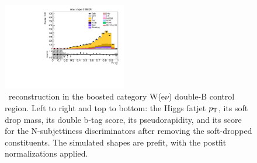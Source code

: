 \begin{figure}[tbp]
\begin{center}
    \includegraphics[width=0.48\textwidth]{figures/wlnhbb2016/boosted/WenWHTT2bFJCR_fj1Tau32SD.pdf}
    \caption{\HBB\ reconstruction in the boosted category W(e$\nu$) double-B control region.
    Left to right and top to bottom: the Higgs fatjet $p_{\mathrm{T}}$, its soft drop mass, its
    double b-tag score, its pseudorapidity, and its score for the N-subjettiness discriminators
    after removing the soft-dropped constituents.
    The simulated shapes are prefit, with the postfit normalizations applied.}
    \label{fig:boost_WenTT2b_Hbb}
  \end{center}
\end{figure}
\clearpage

